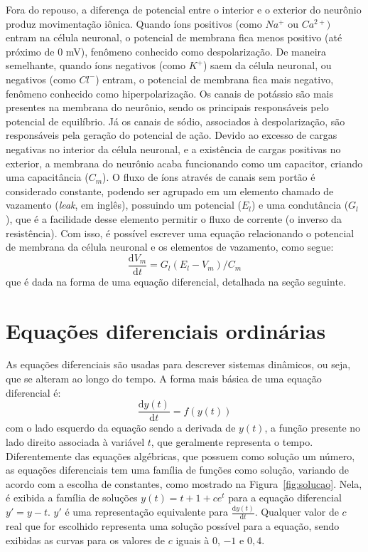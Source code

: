 Fora do repouso, a diferença de potencial entre o interior e o exterior do neurônio produz movimentação iônica. Quando íons positivos (como $Na^+$ ou $Ca^{2+})$ entram na célula neuronal, o potencial de membrana fica menos positivo (até próximo de 0 mV), fenômeno conhecido como despolarização. De maneira semelhante, quando íons negativos (como $K^+$) saem da célula neuronal, ou negativos (como $Cl^-$) entram, o potencial de membrana fica mais negativo, fenômeno conhecido como hiperpolarização. Os canais de potássio são mais presentes na membrana do neurônio, sendo os principais responsáveis pelo potencial de equilíbrio. Já os canais de sódio, associados à despolarização, são responsáveis pela geração do potencial de ação. Devido ao excesso de cargas negativas no interior da célula neuronal, e a existência de cargas positivas no exterior, a membrana do neurônio acaba funcionando como um capacitor, criando uma capacitância ($C_m$). O fluxo de íons através de canais sem portão é considerado constante, podendo ser agrupado em um elemento chamado de vazamento (\textit{leak}, em inglês), possuindo um potencial ($E_l$) e uma condutância ($G_l$), que é a facilidade desse elemento permitir o fluxo de corrente (o inverso da resistência). Com isso, é possível escrever uma equação relacionando o potencial de membrana da célula neuronal e os elementos de vazamento, como segue:
\begin{equation}\label{eq:potencial_membrana}
	\frac{\mathrm{d}V_m}{\mathrm{d}t}=G_l(E_l-V_m)/C_m
\end{equation}
que é dada na forma de uma equação diferencial, detalhada na seção seguinte.

\section{Equações diferenciais ordinárias}\label{sec:eqdif}
As equações diferenciais são usadas para descrever sistemas dinâmicos, ou seja, que se alteram ao longo do tempo. A forma mais básica de uma equação diferencial é:
\begin{equation}\label{eq:eq_diferencial}
	\frac{\mathrm{d}y(t)}{\mathrm{d}t}=f(y(t))
\end{equation}
com o lado esquerdo da equação sendo a derivada de $y(t)$, a função presente no lado direito associada à variável $t$, que geralmente representa o tempo. Diferentemente das equações algébricas, que possuem como solução um número, as equações diferenciais tem uma família de funções como solução, variando de acordo com a escolha de constantes, como mostrado na Figura~\ref{fig:solucao}. Nela, é exibida a família de soluções $y(t) = t + 1 + ce^t$ para a equação diferencial $y'=y-t$. $y'$ é uma representação equivalente para $\frac{\mathrm{d}y(t)}{\mathrm{d}t}$. Qualquer valor de $c$ real que for escolhido representa uma solução possível para a equação, sendo exibidas as curvas para os valores de $c$ iguais à $0$, $-1$ e $0,4$.

